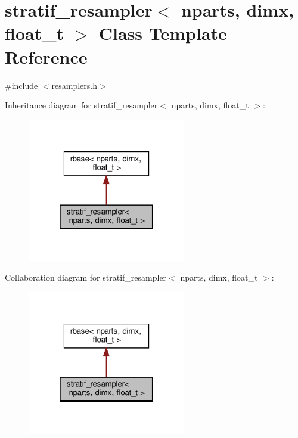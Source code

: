 \hypertarget{classstratif__resampler}{}\section{stratif\+\_\+resampler$<$ nparts, dimx, float\+\_\+t $>$ Class Template Reference}
\label{classstratif__resampler}


{\ttfamily \#include $<$resamplers.\+h$>$}



Inheritance diagram for stratif\+\_\+resampler$<$ nparts, dimx, float\+\_\+t $>$\+:
\nopagebreak
\begin{figure}[H]
\begin{center}
\leavevmode
\includegraphics[width=196pt]{classstratif__resampler__inherit__graph}
\end{center}
\end{figure}


Collaboration diagram for stratif\+\_\+resampler$<$ nparts, dimx, float\+\_\+t $>$\+:
\nopagebreak
\begin{figure}[H]
\begin{center}
\leavevmode
\includegraphics[width=196pt]{classstratif__resampler__coll__graph}
\end{center}
\end{figure}
